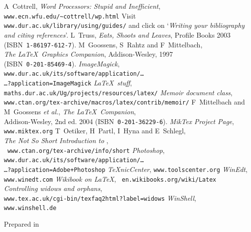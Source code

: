 \documentclass[a4paper,11pt]{report}
\newcommand\etal{\textsl{et al.}}
\newcommand\Quote[1]{\lq\textsl{#1}\rq}
\begin{document}
\begin{thebibliography}{9999}%
A~Cottrell, \textsl{Word Processors: Stupid and
Inefficient},
\\ \mbox{}\hfill\texttt{www.ecn.wfu.edu/\~{}cottrell/wp.html}
Visit \texttt{www.dur.ac.uk/library/using/guides/}
and click on \Quote{Writing your bibliography and citing references}.
L~Truss, \textsl{Eats, Shoots and Leaves}, Profile
  Books 2003\\ \mbox{}\hfill(ISBN~\texttt{1-86197-612-7}).
M~Goossens, S~Rahtz and F~Mittelbach,\\
  \mbox{}\hfill \textsl{The \LaTeX\ Graphics Companion},
  Addison-Wesley, 1997\\  \mbox{}\hfill(ISBN~\texttt{0-201-85469-4}).
 \textsl{ImageMagick}, {\tt%
www.dur.ac.uk/its/software/application/\dots
\\ \mbox{}\hfill\dots?application=ImageMagick}
 \textsl{\LaTeX\ stuff},
	\texttt{maths.dur.ac.uk/Ug/projects/resources/latex/}
 \textsl{Memoir document class},\\ \mbox{}\hfill
   \texttt{www.ctan.org/tex-archive/macros/latex/contrib/memoir/}
F~Mittelbach and M~Goossens \etal, \textsl{The
\LaTeX\ Companion},\\  \mbox{}\hfill Addison-Wesley, 2nd ed. 2004
(ISBN~\texttt{0-201-36229-6}).
 \textsl{MikTex Project Page}, \texttt{www.miktex.org}
T~Oetiker, H~Partl, I~Hyna and E~Schlegl,\\
\mbox{}\hfill
\textsl{The Not So Short Introduction to \LaTeXe},\\ \mbox{}\hfill{\tt
www.ctan.org/tex-archive/info/short}
 \textsl{Photoshop}, {\tt%
www.dur.ac.uk/its/software/application/\dots
\\ \mbox{}\hfill\dots?application=Adobe+Photoshop}
 \textsl{TeXnicCenter}, \texttt{www.toolscenter.org}
 \textsl{WinEdt}, \texttt{www.winedt.com}
 \textsl{Wikibook on \LaTeX}, \texttt{%
	en.wikibooks.org/wiki/Latex}
 \textsl{Controlling widows and orphans}, 
\\ \mbox{}\hfill\texttt{www.tex.ac.uk/cgi-bin/texfaq2html?label=widows}
 \textsl{WinShell}, \texttt{www.winshell.de}
\end{thebibliography}
\vfill
\begin{flushright}\small Prepared in \LaTeXe\ \end{flushright}

\appendix





\end{document}
